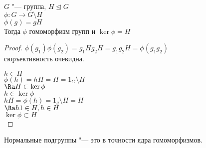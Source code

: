\begin{theorem}
$G$ "--- группа, $H \unlhd G$\\
$\phi \colon G \to G \setminus H$\\
$\phi(g) = gH$ \\

Тогда $\phi$ гомоморфизм групп и  $\ker \phi = H$\\
\end{theorem}
\begin{proof}
$\phi(g_1)\phi(g_2) = g_1Hg_2H = g_1g_2H = \phi(g_1g_2)$\\
сюръективность очевидна. 

$h \in H$\\
$\phi(h) = hH =  H = 1_{G}\setminus H$\\
$\Ra H \subset \ker \phi$\\
$h \in \ker \phi$\\
$hH = \phi(h) = 1_g\setminus H = H$ \\
$\Ra h1 \in H, h \in H$\\
$\ker \phi \subset H$\\

\end{proof}

\begin{conseq}
Нормальные подгруппы "--- это в точности ядра гомоморфизмов.
\end{conseq}